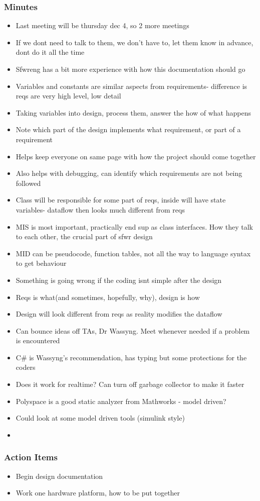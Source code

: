 		\subsubsection*{Minutes}
			\begin{itemize}
				\item Last meeting will be thursday dec 4, so 2 more meetings
				\item If we dont need to talk to them, we don't have to, let them know in advance, dont do it all the time
				\item Sfwreng has a bit more experience with how this documentation should go 
				\item Variables and constants are similar aspects from requirements- difference is reqs are very high level, low detail
				\item Taking variables into design, process them, answer the how of what happens
				\item Note which part of the design implements what requirement, or part of a requirement
				\item Helps keep everyone on same page with how the project should come together
				\item Also helps with debugging, can identify which requirements are not being followed
				\item Class will be responsible for some part of reqs, inside will have state variables- dataflow then looks much different from reqs 
				\item MIS is most important, practically end sup as class interfaces. How they talk to each other, the crucial part of sfwr design
				\item MID can be pseudocode, function tables, not all the way to language syntax to get behaviour
				\item Something is going wrong if the coding isnt simple after the design
				\item Reqs is what(and sometimes, hopefully, why), design is how
				\item Design will look different from reqs as reality modifies the dataflow
				\item Can bounce ideas off TAs, Dr Wassyng. Meet whenever needed if a problem is encountered
				\item C# is Wassyng's recommendation, has typing but some protections for the coders
				\item Does it work for realtime? Can turn off garbage collector to make it faster
				\item Polyspace is a good static analyzer from Mathworks - model driven?
				\item Could look at some model driven tools (simulink style)
				\item 
			\end{itemize}

		\subsubsection*{Action Items}
			\begin{itemize}
				\item Begin design documentation
				\item Work one hardware platform, how to be put together
			\end{itemize}



